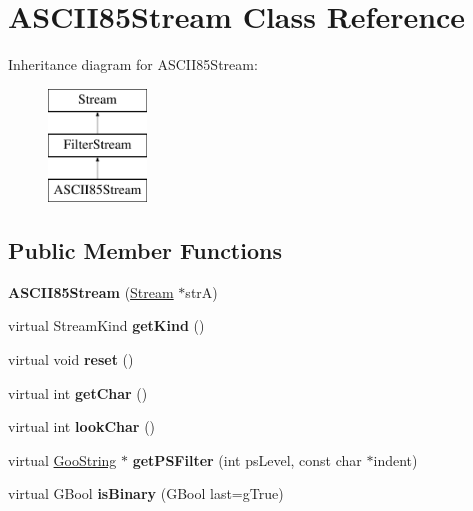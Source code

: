 \hypertarget{class_a_s_c_i_i85_stream}{}\section{A\+S\+C\+I\+I85\+Stream Class Reference}
\label{class_a_s_c_i_i85_stream}
Inheritance diagram for A\+S\+C\+I\+I85\+Stream\+:\begin{figure}[H]
\begin{center}
\leavevmode
\includegraphics[height=3.000000cm]{class_a_s_c_i_i85_stream}
\end{center}
\end{figure}
\subsection*{Public Member Functions}
\begin{DoxyCompactItemize}
\item 
\mbox{\label{class_a_s_c_i_i85_stream_add44ea1b590c7fbfc8a103d8f1607d4f}} 
{\bfseries A\+S\+C\+I\+I85\+Stream} (\hyperlink{class_stream}{Stream} $\ast$strA)
\item 
\mbox{\label{class_a_s_c_i_i85_stream_a22ebc2fe1b93c9d91c3cf7a8f1f4867e}} 
virtual Stream\+Kind {\bfseries get\+Kind} ()
\item 
\mbox{\label{class_a_s_c_i_i85_stream_a2cbc5c84631845bf7fb3016c7187a5f9}} 
virtual void {\bfseries reset} ()
\item 
\mbox{\label{class_a_s_c_i_i85_stream_a868cf5cc01467c9dcfb91ab044d05b0a}} 
virtual int {\bfseries get\+Char} ()
\item 
\mbox{\label{class_a_s_c_i_i85_stream_a793b79853e149718803173b50d1530c9}} 
virtual int {\bfseries look\+Char} ()
\item 
\mbox{\label{class_a_s_c_i_i85_stream_a573b4be7b3cc24b49b52abcbe7207c8e}} 
virtual \hyperlink{class_goo_string}{Goo\+String} $\ast$ {\bfseries get\+P\+S\+Filter} (int ps\+Level, const char $\ast$indent)
\item 
\mbox{\label{class_a_s_c_i_i85_stream_a898455ded75879bd1da8c94811236e78}} 
virtual G\+Bool {\bfseries is\+Binary} (G\+Bool last=g\+True)
\end{DoxyCompactItemize}
